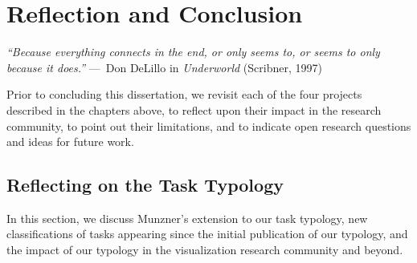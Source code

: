 

\chapter{Reflection and Conclusion}
\label{ch:conclusions}


\begin{epigraph}
    \emph{``Because everything connects in the end, or only seems to, or seems to only because it does.''} ---~Don DeLillo in \emph {Underworld} (Scribner, 1997)
\end{epigraph}

Prior to concluding this dissertation, we revisit each of the four projects described in the chapters above, to reflect upon their impact in the research community, to point out their limitations, and to indicate open research questions and ideas for future work. 


\section{Reflecting on the Task Typology}
\label{conclusions:typology}


In this section, we discuss Munzner's extension to our task typology, new classifications of tasks appearing since the initial publication of our typology, and the impact of our typology in the visualization research community and beyond.


